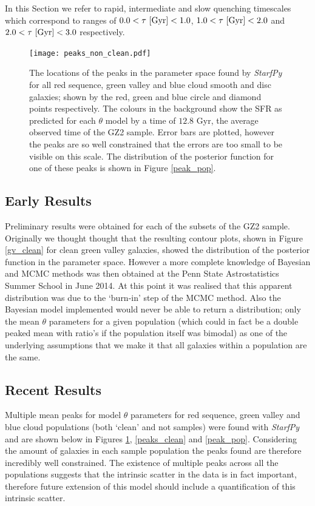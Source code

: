 \documentclass{mn2e}
\begin{document}
In this Section we refer to rapid, intermediate and slow quenching timescales which correspond to ranges of $0.0 < \tau ~\rm{[Gyr]} < 1.0$, $1.0 < \tau ~\rm{[Gyr]} < 2.0$ and $2.0 < \tau ~\rm{[Gyr]} < 3.0$ respectively.
 
\begin{figure}
\texttt{[image: peaks\_non\_clean.pdf]}
\caption{The locations of the peaks in the parameter space found by \emph{StarfPy} for all red sequence, green valley and blue cloud smooth and disc galaxies; shown by the red, green and blue circle and diamond points respectively. The colours in the background show the SFR as predicted for each $\theta$ model by a time of $12.8$ Gyr, the average observed time of the GZ2 sample. Error bars are plotted, however the peaks are so well constrained that the errors are too small to be visible on this scale. The distribution of the posterior function for one of these peaks is shown in Figure \ref{peak_pop}.}
\label{peaks_non}
\end{figure}

\subsection{Early Results}
Preliminary results were obtained for each of the subsets of the GZ2 sample. Originally we thought thought that the resulting contour plots, shown in Figure \ref{gv_clean} for clean green valley galaxies, showed the distribution of the posterior function in the parameter space. However a more complete knowledge of Bayesian and MCMC methods was then obtained at the Penn State Astrostatistics Summer School in June 2014. At this point it was realised that this apparent distribution was due to the `burn-in' step of the MCMC method. Also the Bayesian model implemented would never be able to return a distribution; only the mean $\theta$ parameters for a given population (which could in fact be a double peaked mean with ratio's if the population itself was bimodal) as one of the underlying assumptions that we make it that all galaxies within a population are the same. 

\subsection{Recent Results}

Multiple mean peaks for model $\theta$ parameters for red sequence, green valley and blue cloud populations (both `clean' and not samples) were found with \emph{StarfPy} and are shown below in Figures \ref{peaks_non},  \ref{peaks_clean} and \ref{peak_pop}.  Considering the amount of galaxies in each sample population the peaks found are therefore incredibly well constrained. The existence of multiple peaks across all the populations suggests that the intrinsic scatter in the data is in fact important, therefore future extension of this model should include a quantification of this intrinsic scatter.  
\end{document}
